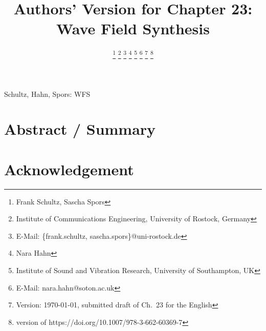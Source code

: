 \documentclass[10pt, journal, transmag]{IEEEtran}
\begin{document}
\title{Authors' Version for Chapter 23: Wave Field Synthesis}
\author{
\ifdefined\SPRINGER
{}
\else
{}
\fi
\thanks{Frank Schultz, Sascha Spors}
\thanks{Institute of Communications Engineering, University of Rostock, Germany}
\thanks{E-Mail: \{frank.schultz, sascha.spors\}@uni-rostock.de}
%
\thanks{Nara Hahn}
\thanks{Institute of Sound and Vibration Research, University of Southampton, UK}
\thanks{E-Mail: nara.hahn@soton.ac.uk}
%
\thanks{Version: \today, submitted draft of Ch.~23 for the English}
\thanks{version of https://doi.org/10.1007/978-3-662-60369-7}
}
%
%
{Schultz, Hahn, Spors: WFS}
%
%
\maketitle
%
\section*{Abstract / Summary}

%

%
\section*{Acknowledgement}

%
\ifdefined\SPRINGER
    
    
\else
    
    
\fi
%
\printindex
%
\end{document}
